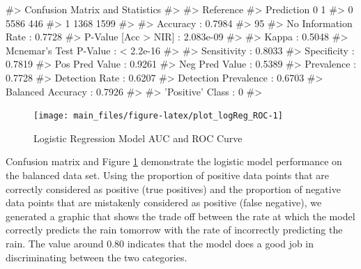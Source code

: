\begin{Schunk}
\begin{Soutput}
#> Confusion Matrix and Statistics
#> 
#>           Reference
#> Prediction    0    1
#>          0 5586  446
#>          1 1368 1599
#>                                         
#>                Accuracy : 0.7984        
#>                  95%
#>     No Information Rate : 0.7728        
#>     P-Value [Acc > NIR] : 2.083e-09     
#>                                         
#>                   Kappa : 0.5048        
#>  Mcnemar's Test P-Value : < 2.2e-16     
#>                                         
#>             Sensitivity : 0.8033        
#>             Specificity : 0.7819        
#>          Pos Pred Value : 0.9261        
#>          Neg Pred Value : 0.5389        
#>              Prevalence : 0.7728        
#>          Detection Rate : 0.6207        
#>    Detection Prevalence : 0.6703        
#>       Balanced Accuracy : 0.7926        
#>                                         
#>        'Positive' Class : 0             
#> 
\end{Soutput}
\end{Schunk}

\begin{Schunk}
\begin{figure}[H]

{\centering \texttt{[image: main\_files/figure-latex/plot\_logReg\_ROC-1]} 

}

\caption[Logistic Regression Model AUC and ROC Curve]{Logistic Regression Model AUC and ROC Curve}\label{fig:plot_logReg_ROC}
\end{figure}
\end{Schunk}

Confusion matrix and Figure \ref{fig:plot_logReg_ROC} demonstrate the
logistic model performance on the balanced data set. Using the
proportion of positive data points that are correctly considered as
positive (true positives) and the proportion of negative data points
that are mistakenly considered as positive (false negative), we
generated a graphic that shows the trade off between the rate at which
the model correctly predicts the rain tomorrow with the rate of
incorrectly predicting the rain. The value around 0.80 indicates that
the model does a good job in discriminating between the two categories.

